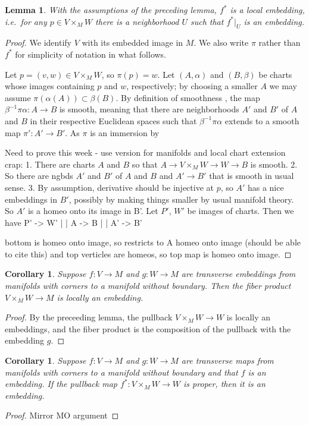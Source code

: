 \documentclass[12pt]{article}
\theoremstyle{plain}
\newtheorem{corollary}[theorem]{Corollary}
\newtheorem{lemma}[theorem]{Lemma}
\theoremstyle{definition}
\theoremstyle{remark}
\begin{document}
\begin{lemma}
With the assumptions of the preceding lemma, $f^*$ is a local embedding, i.e.\ for any $p \in V \times_M W$ there is a neighborhood $U$ such that $f^*|_U$ is an embedding.
\end{lemma}
\begin{proof}
We identify $V$ with its embedded image in $M$.
We also write $\pi$ rather than $f^*$ for simplicity of notation in what follows.
 
Let $p = (v,w) \in V \times_M W$, so $\pi(p)=w$. 
Let $(A, \alpha)$ and $(B, \beta)$ be charts whose images containing $p$ and $w$, respectively; by choosing a smaller $A$ we may assume $\pi(\alpha(A)) \subset \beta(B)$. 
By definition of smoothness \cite[Definition 3.1]{Joy12}, the map $\beta^{-1}\pi\alpha \colon A \to B$ is smooth, meaning that there are neighborhoods $A'$ and $B'$ of $A$ and $B$ in their respective Euclidean spaces such that $\beta^{-1}\pi\alpha$ extends to a smooth map $\pi': A' \to B'$. 
As $\pi$ is an immersion by 


Need to prove this week - use version for manifolds and local chart extension crap:
1. There are charts $A$ and $B$ so that $A \to V \times_M W \to W \to B$ is smooth. 
2. So there are ngbds $A'$ and $B'$ of $A$ and $B$ and $A' \to B'$ that is smooth in usual sense.
3. By assumption, derivative should be injective at $p$, so $A'$ has a nice embeddings in $B'$, possibly by making things smaller by usual manifold theory.  
So $A'$ is a homeo onto its image in B'.
Let $P'$, $W'$ be images of charts. 
Then we have 
P' -> W'
|     |
A  -> B
|     |
A' -> B'

bottom is homeo onto image, so restricts to A homeo onto image (should be able to cite this)
and top verticles are homeos, so top map is homeo onto image.
\end{proof}

\begin{corollary}
	Suppose $f \colon V \to M$ and $g \colon W \to M$ are transverse embeddings from manifolds with corners to a manifold without boundary. Then the fiber product $V \times_M W \to M$ is locally an embedding. 
\end{corollary}
\begin{proof}
By the preceeding lemma, the pullback $V \times_M W \to W$ is locally an embeddings, and the fiber product is the composition of the pullback with the embedding $g$.
\end{proof}


\begin{corollary}
	Suppose $f \colon V \to M$ and $g \colon W \to M$ are transverse maps from manifolds with corners to a manifold without boundary and that $f$ is an embedding. 
	If the pullback map $f^* \colon V \times_M W \to W$ is proper, then it is an embedding.
\end{corollary}
\begin{proof}
Mirror MO argument
\end{proof}
\end{document}
